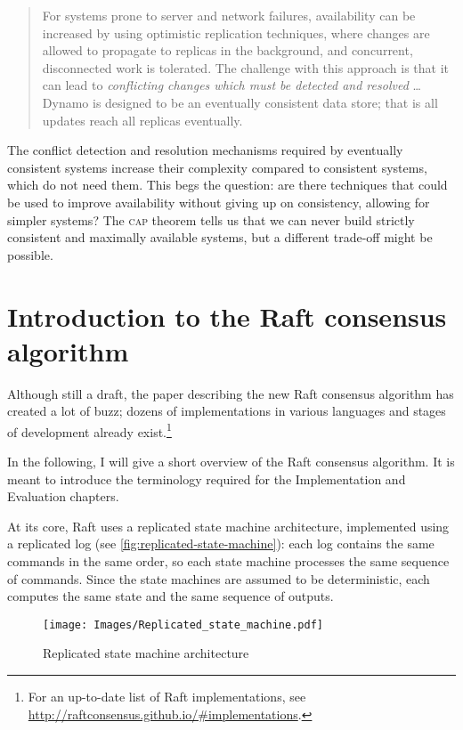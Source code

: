 \documentclass[11pt,chapterprefix=true,toc=bibliography,numbers=noendperiod,
               footnotes=multiple,twoside]{scrreprt}
\begin{document}
\begin{quote}
    For systems prone to server and network failures, availability can be increased by using optimistic replication techniques, where changes are allowed to propagate to replicas in the background, and concurrent, disconnected work is tolerated. The challenge with this approach is that it can lead to \emph{conflicting changes which must be detected and resolved} \dots{} Dynamo is designed to be an eventually consistent data store; that is all updates reach all replicas eventually.
\end{quote}

The conflict detection and resolution mechanisms required by eventually consistent systems increase their complexity compared to consistent systems, which do not need them. This begs the question: are there techniques that could be used to improve availability without giving up on consistency, allowing for simpler systems? The \textsc{cap} theorem tells us that we can never build strictly consistent and maximally available systems, but a different trade-off might be possible.

\section{Introduction to the Raft consensus algorithm\label{ssc:raft-consensus-algorithm}}

Although still a draft, the paper describing the new Raft consensus algorithm \autocite{raft} has created a lot of buzz; dozens of implementations in various languages and stages of development already exist.\footnote{For an up-to-date list of Raft implementations, see \url{http://raftconsensus.github.io/\#implementations}.}

In the following, I will give a short overview of the Raft consensus algorithm. It is meant to introduce the terminology required for the Implementation and Evaluation chapters.

At its core, Raft uses a replicated state machine architecture, implemented using a replicated log (see \autoref{fig:replicated-state-machine}): each log contains the same commands in the same order, so each state machine processes the same sequence of commands. Since the state machines are assumed to be deterministic, each computes the same state and the same sequence of outputs.

\begin{figure}[h]
    \centering
    \texttt{[image: Images/Replicated\_state\_machine.pdf]}
    \caption{Replicated state machine architecture}
    \label{fig:replicated-state-machine}
\end{figure}
\end{document}
